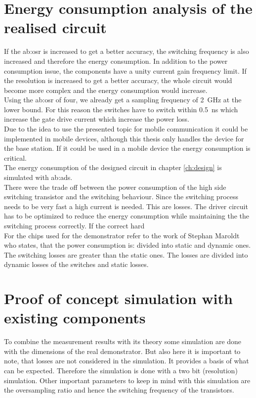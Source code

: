\section{Energy consumption analysis of the realised circuit}
If the \gls{ab:osr} is increased to get a better accuracy, the switching frequency is also increased and therefore the energy consumption.
In addition to the power consumption issue, the components have a unity current gain frequency limit.
If the resolution is increased to get a better accuracy, the whole circuit would become more complex and the energy consumption would increase.\\
Using the \gls{ab:osr} of four, we already get a sampling frequency of \SI{2}{GHz} at the lower bound.
For this reason the switches have to switch within \SI{0.5}{\nano \second} which increase the gate drive current which increase the power loss.\\
Due to the idea to use the presented topic for mobile communication it could be implemented in mobile devices, although this thesis only handles the device for the base station. If it could be used in a mobile device the energy consumption is critical.\\
The energy consumption of the designed circuit in chapter \ref{ch:design} is simulated with \gls{ab:ads}.\\
There were the trade off between the power consumption of the high side switching transistor and the switching behaviour.
Since the switching process needs to be very fast a high current is needed.
This are losses.
The driver circuit has to be optimized to reduce the energy consumption while maintaining the the switching process correctly.
If the correct hard 
\\
 For the chips used for the demonstrator refer to the work of Stephan Maroldt who states, that the power consumption is:  divided into static and dynamic ones. The switching losses are greater than the static ones.
The losses are divided into dynamic losses of the switches and static losses.

\section{Proof of concept simulation with existing components}
\label{ch:ProofOfConceptWithExistingComponents}
To combine the measurement results with its theory some simulation are done  with the dimensions of the real demonstrator.
But also here it is important to note, that losses are not considered in the simulation.
It provides a basis of what can be expected.
Therefore the simulation is done with a two bit (resolution) simulation.
Other important parameters to keep in mind with this simulation are the oversampling ratio and hence the switching frequency of the transistors.

